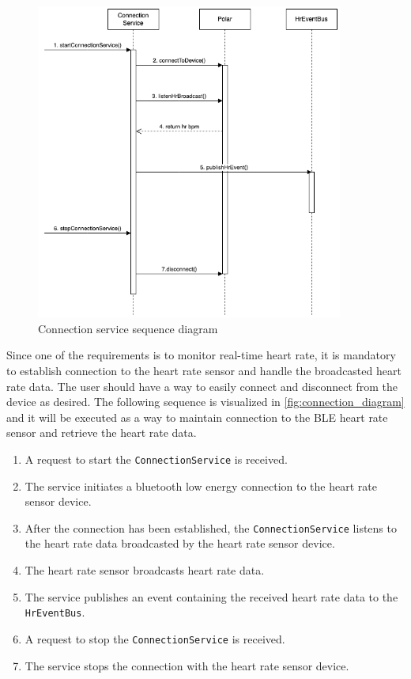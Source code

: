 \begin{figure}[H]
    \centering
    \includegraphics[width=0.9\textwidth]{diagrams/connection-service-onStart.drawio.png}
    \caption{Connection service sequence diagram}
    \label{fig:connection_diagram}
\end{figure}
Since one of the requirements is to monitor real-time heart rate, it is mandatory to establish connection to the heart rate sensor and handle the broadcasted heart rate data. The user should have a way to easily connect and disconnect from the device as desired.
The following sequence is visualized in \autoref{fig:connection_diagram} and it will be executed as a way to maintain connection to the BLE heart rate sensor and retrieve the heart rate data.
\begin{enumerate}
    \item A request to start the \texttt{ConnectionService} is received.
    \item The service initiates a bluetooth low energy connection to the heart rate sensor device.
    \item After the connection has been established, the \texttt{ConnectionService} listens to the heart rate data broadcasted by the heart rate sensor device.
    \item The heart rate sensor broadcasts heart rate data.
    \item The service publishes an event containing the received heart rate data to the \texttt{HrEventBus}.
    \item A request to stop the \texttt{ConnectionService} is received.
    \item The service stops the connection with the heart rate sensor device.
\end{enumerate}

